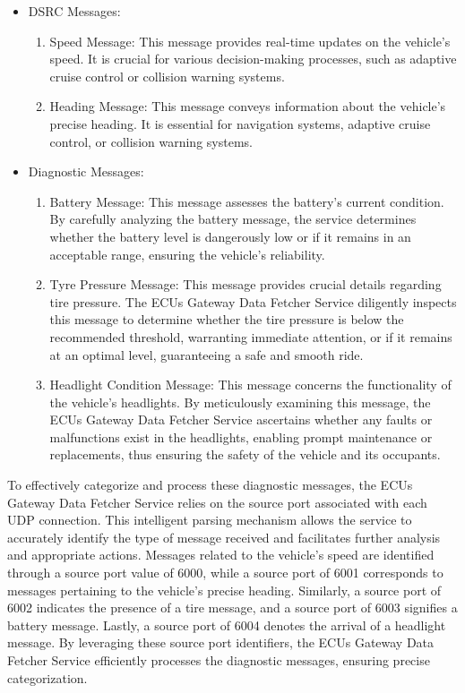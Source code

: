 \documentclass[
12pt,
oneside, 
onehalfspacing, 
nolistspacing, 
parskip, 
chapterinoneline, 
]{AASTCOMPUTER}
\begin{document}
\begin{itemize}
  \item DSRC Messages:
  \begin{enumerate}
    \item Speed Message: This message provides real-time updates on the vehicle's speed. It is crucial for various decision-making processes, such as adaptive cruise control or collision warning systems.
    \item Heading Message: This message conveys information about the vehicle's precise heading. It is essential for navigation systems, adaptive cruise control, or collision warning systems.
  \end{enumerate}

  \item Diagnostic Messages:
  \begin{enumerate}
    \item Battery Message: This message assesses the battery's current condition. By carefully analyzing the battery message, the service determines whether the battery level is dangerously low or if it remains in an acceptable range, ensuring the vehicle's reliability.
    \item Tyre Pressure Message: This message provides crucial details regarding tire pressure. The ECUs Gateway Data Fetcher Service diligently inspects this message to determine whether the tire pressure is below the recommended threshold, warranting immediate attention, or if it remains at an optimal level, guaranteeing a safe and smooth ride.
    \item Headlight Condition Message: This message concerns the functionality of the vehicle's headlights. By meticulously examining this message, the ECUs Gateway Data Fetcher Service ascertains whether any faults or malfunctions exist in the headlights, enabling prompt maintenance or replacements, thus ensuring the safety of the vehicle and its occupants.
  \end{enumerate}
\end{itemize}

To effectively categorize and process these diagnostic messages, the ECUs Gateway Data Fetcher Service relies on the source port associated with each UDP connection. This intelligent parsing mechanism allows the service to accurately identify the type of message received and facilitates further analysis and appropriate actions. Messages related to the vehicle's speed are identified through a source port value of 6000, while a source port of 6001 corresponds to messages pertaining to the vehicle's precise heading. Similarly, a source port of 6002 indicates the presence of a tire message, and a source port of 6003 signifies a battery message. Lastly, a source port of 6004 denotes the arrival of a headlight message. By leveraging these source port identifiers, the ECUs Gateway Data Fetcher Service efficiently processes the diagnostic messages, ensuring precise categorization.
\end{document}

